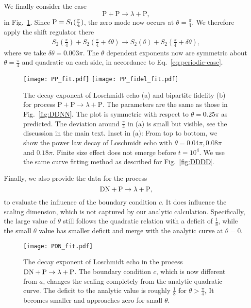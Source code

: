 We finally consider the case
\begin{equation}
\text{P}+\text{P}\rightarrow\lambda+\text{P},
\end{equation}
in Fig.~\ref{fig:PPPP}. Since ${\rm P} = S_1( \frac{\pi}{4} ) $, the zero mode now occurs at $\theta = \frac{\pi}{4}$. We therefore apply the shift regulator there 
\begin{equation}
\begin{aligned}
\label{eq:approx_DNDN}
S_2\left(\frac{\pi}{4}\right)+S_2\left(\frac{\pi}{4}+\delta\theta\right)\rightarrow S_2(\theta)+S_2\left(\frac{\pi}{4}+\delta\theta\right),
\end{aligned}
\end{equation}
where we take $\delta\theta=0.003\pi$. The $\theta$ dependent exponents now are symmetric about $\theta=\frac{\pi}{4}$ and quadratic on each side, in accordance to Eq.~\eqref{eq:periodic-case}.

\begin{figure}
  \centering
  \texttt{[image: PP\_fit.pdf]}
    \texttt{[image: PP\_fidel\_fit.pdf]}
    \caption{The decay exponent of Loschmidt echo (a) and bipartite fidelity (b) for process $\text{P}+\text{P}\rightarrow\lambda+\text{P}$. The parameters are the same as those in Fig.~\ref{fig:DDNN}. The plot is symmetric with respect to $\theta=0.25\pi$ as predicted. The deviation around $\frac{\pi}{4}$ in (a) is small but visible, see the discussion in the main text. Inset in (a): From top to bottom, we show the power law decay of Loschmidt echo with $\theta=0.04\pi, 0.08\pi $ and $0.18\pi$. Finite size effect does not emerge before $t=10^{4}$. We use the same curve fitting method as described for Fig.~\ref{fig:DDDD}.}
    \label{fig:PPPP}
\end{figure}

Finally, we also provide the data for the process
\begin{equation}
{\rm DN} + {\rm P} \rightarrow \lambda  + {\rm P},
\end{equation}
to evaluate the influence of the boundary condition $c$. It {\rm does} influence the scaling dimension, which is not captured by our analytic calculation. Specifically, the large value of $\theta$ still follows the quadratic relation with a deficit of $\frac{1}{8}$, while the small $\theta$ value has smaller deficit and merge with the analytic curve at $\theta = 0$. 
\begin{figure}[htb]
\centering
\texttt{[image: PDN\_fit.pdf]}
\caption{The decay exponent of Loschmidt echo in the process ${\rm DN} + {\rm P} \rightarrow \lambda  + {\rm P}$. The boundary condition $c$, which is now different from $a$, changes the scaling completely from the analytic quadratic curve. The deficit to the analytic value is roughly $\frac{1}{8}$ for $\theta > \frac{\pi}{4}$, It becomes smaller and approaches zero for small $\theta$. }
\label{fig:PDN_fit}
\end{figure}

